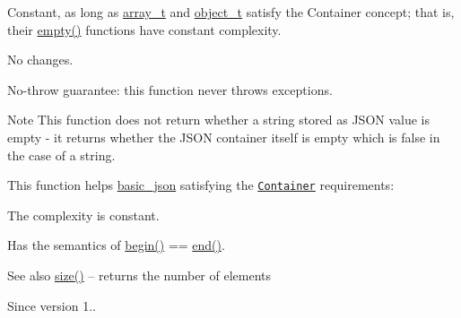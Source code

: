 Constant, as long as \mbox{\hyperlink{classnlohmann_1_1basic__json_ae095578e03df97c5b3991787f1056374}{array\+\_\+t}} and \mbox{\hyperlink{classnlohmann_1_1basic__json_a5e48a7893520e1314bf0c9723e26ea2a}{object\+\_\+t}} satisfy the Container concept; that is, their {\ttfamily \mbox{\hyperlink{classnlohmann_1_1basic__json_a1a86d444bfeaa9518d2421aedd74444a}{empty()}}} functions have constant complexity.

No changes.

No-\/throw guarantee\+: this function never throws exceptions.

\begin{DoxyNote}{Note}
This function does not return whether a string stored as J\+S\+ON value is empty -\/ it returns whether the J\+S\+ON container itself is empty which is false in the case of a string.
\end{DoxyNote}
This function helps {\ttfamily \mbox{\hyperlink{classnlohmann_1_1basic__json}{basic\+\_\+json}}} satisfying the \href{https://en.cppreference.com/w/cpp/named_req/Container}{\tt Container} requirements\+:
\begin{DoxyItemize}
\item The complexity is constant.
\item Has the semantics of {\ttfamily \mbox{\hyperlink{classnlohmann_1_1basic__json_a0ff28dac23f2bdecee9564d07f51dcdc}{begin()}} == \mbox{\hyperlink{classnlohmann_1_1basic__json_a13e032a02a7fd8a93fdddc2fcbc4763c}{end()}}}.
\end{DoxyItemize}

\begin{DoxySeeAlso}{See also}
\mbox{\hyperlink{classnlohmann_1_1basic__json_a25e27ad0c6d53c01871c5485e1f75b96}{size()}} -- returns the number of elements
\end{DoxySeeAlso}
\begin{DoxySince}{Since}
version 1.. 
\end{DoxySince}
\mbox{\label{classnlohmann_1_1basic__json_a13e032a02a7fd8a93fdddc2fcbc4763c}} 
